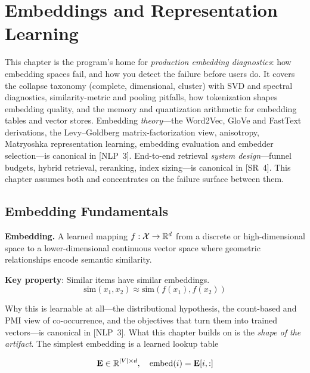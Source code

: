 \chapter{Embeddings and Representation Learning}
\label{chap:embeddings}

\begin{tldr}
This chapter is the program's home for \emph{production embedding diagnostics}: how embedding spaces fail, and how you detect the failure before users do. It covers the collapse taxonomy (complete, dimensional, cluster) with SVD and spectral diagnostics, similarity-metric and pooling pitfalls, how tokenization shapes embedding quality, and the memory and quantization arithmetic for embedding tables and vector stores. Embedding \emph{theory}---the Word2Vec, GloVe and FastText derivations, the Levy--Goldberg matrix-factorization view, anisotropy, Matryoshka representation learning, embedding evaluation and embedder selection---is canonical in [NLP~3]. End-to-end retrieval \emph{system design}---funnel budgets, hybrid retrieval, reranking, index sizing---is canonical in [SR~4]. This chapter assumes both and concentrates on the failure surface between them.
\end{tldr}

\section{Embedding Fundamentals}
\label{sec:embedding_fundamentals}

\textbf{Embedding.} A learned mapping $f: \mathcal{X} \to \mathbb{R}^d$ from a discrete or high-dimensional space to a lower-dimensional continuous vector space where geometric relationships encode semantic similarity.

\textbf{Key property}: Similar items have similar embeddings.
\begin{equation}
\text{sim}(x_1, x_2) \approx \text{sim}(f(x_1), f(x_2))
\end{equation}

Why this is learnable at all---the distributional hypothesis, the count-based and PMI view of co-occurrence, and the objectives that turn them into trained vectors---is canonical in [NLP~3]. What this chapter builds on is the \emph{shape of the artifact}. The simplest embedding is a learned lookup table

\begin{equation}
\mathbf{E} \in \mathbb{R}^{|V| \times d}, \quad \text{embed}(i) = \mathbf{E}[i, :]
\end{equation}

